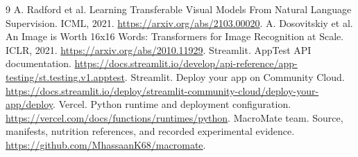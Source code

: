 \documentclass[11pt,a4paper]{article}
\begin{document}
\clearpage
\begin{thebibliography}{9}
 A. Radford et al. Learning Transferable Visual Models From Natural
Language Supervision. ICML, 2021. \url{https://arxiv.org/abs/2103.00020}.
 A. Dosovitskiy et al. An Image is Worth 16x16 Words: Transformers for
Image Recognition at Scale. ICLR, 2021. \url{https://arxiv.org/abs/2010.11929}.
 Streamlit. AppTest API documentation.
\url{https://docs.streamlit.io/develop/api-reference/app-testing/st.testing.v1.apptest}.
 Streamlit. Deploy your app on Community Cloud.
\url{https://docs.streamlit.io/deploy/streamlit-community-cloud/deploy-your-app/deploy}.
 Vercel. Python runtime and deployment configuration.
\url{https://vercel.com/docs/functions/runtimes/python}.
 MacroMate team. Source, manifests, nutrition references, and recorded
experimental evidence. \url{https://github.com/MhassaanK68/macromate}.
\end{thebibliography}
\end{document}
